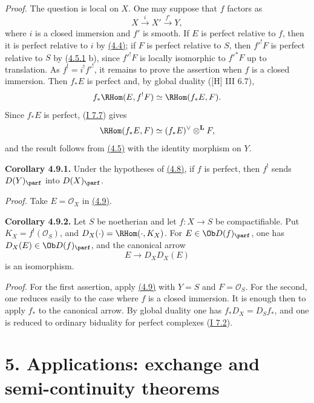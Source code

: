 \emph{Proof.} The question is local on \(X\). One may suppose that \(f\) factors as
\[
 X\xrightarrow{i}X'\xrightarrow{f'}Y,
\]
where \(i\) is a closed immersion and \(f'\) is smooth. If \(E\) is perfect relative to \(f\), then it is perfect relative to \(i\) by \hyperlink{sga6.e03.prop.4-4}{(4.4)}; if \(F\) is perfect relative to \(S\), then \(f'^!F\) is perfect relative to \(S\) by (\hyperlink{sga6.e03.cor.4-5-1}{4.5.1} b), since \(f'^!F\) is locally isomorphic to \(f'^*F\) up to translation. As \(f^!=i^!f'^!\), it remains to prove the assertion when \(f\) is a closed immersion. Then \(f_*E\) is perfect and, by global duality ([H] III 6.7),
\[
 f_*\RHom(E,f^!F)\simeq\RHom(f_*E,F).
\]
Since \(f_*E\) is perfect, (\hyperlink{sga6.e01.cor.7-7}{I 7.7}) gives
\[
 \RHom(f_*E,F)\simeq(f_*E)^{\vee}\otimes^{\mathbf L}F,
\]
and the result follows from \hyperlink{sga6.e03.prop.4-5}{(4.5)} with the identity morphism on \(Y\).

\textbf{Corollary 4.9.1.} Under the hypotheses of \hyperlink{sga6.e03.prop.4-8}{(4.8)}, if \(f\) is perfect, then \(f^!\) sends \(D(Y)_{\parf}\) into \(D(X)_{\parf}\).

\emph{Proof.} Take \(E=\mathcal O_X\) in \hyperlink{sga6.e03.prop.4-9}{(4.9)}.

\textbf{Corollary 4.9.2.} Let \(S\) be noetherian and let \(f:X\to S\) be compactifiable. Put \(K_X=f^!(\mathcal O_S)\), and \(D_X(\cdot)=\RHom(\cdot,K_X)\). For \(E\in\Ob D(f)_{\parf}\), one has \(D_X(E)\in\Ob D(f)_{\parf}\), and the canonical arrow
\[
 E\longrightarrow D_XD_X(E)
\]
is an isomorphism.

\emph{Proof.} For the first assertion, apply \hyperlink{sga6.e03.prop.4-9}{(4.9)} with \(Y=S\) and \(F=\mathcal O_S\). For the second, one reduces easily to the case where \(f\) is a closed immersion. It is enough then to apply \(f_*\) to the canonical arrow. By global duality one has \(f_*D_X=D_Sf_*\), and one is reduced to ordinary biduality for perfect complexes (\hyperlink{sga6.e01.prop.7-2}{I 7.2}).

\section*{5. Applications: exchange and semi-continuity theorems}

